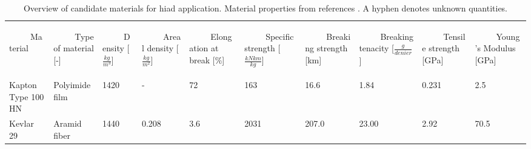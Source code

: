\begin{table}[H]
\caption{Overview of candidate materials for \gls{hiad} application. Material properties from references \cite{Samareh2011,Miller2014}. A hyphen denotes unknown quantities.}
\vspace{41mm}
\hspace{-10mm}
\begin{tabular}{p{}|p{}|p{}|p{}|p{}|p{}|p{}|p{}|p{}|p{}}
\begin{rotate}{60} ~~~~~Material \end{rotate}  &  \begin{rotate}{60} ~~~~~Type of material {[}-{]}  \end{rotate} & \begin{rotate}{60} ~~~~~Density [$\frac{kg}{m^3}$] \end{rotate}& \begin{rotate}{60} ~~~~~Areal density [$\frac{kg}{m^2}$] \end{rotate} & \begin{rotate}{60} ~~~~~Elongation at break [$\%$] \end{rotate} & \begin{rotate}{60} ~~~~~Specific strength [$\frac{kN km}{kg}$]\end{rotate} &  \begin{rotate}{60} ~~~~~Breaking strength [km]\end{rotate} & \begin{rotate}{60} ~~~~~Breaking tenacity [$\frac{g}{denier}$]\end{rotate}&  \begin{rotate}{60} ~~~~~Tensile strength [GPa] \end{rotate} & \begin{rotate}{60} ~~~~~Young's Modulus [GPa] \end{rotate}  \\
Kapton Type 100 HN           & Polyimide film               & 1420                                 & -                                          & 72                           & 163                              & 16.6                       & 1.84                             & 0.231                      & 2.5                                 \\ \hline
Kevlar 29     & Aramid fiber                 & 1440                                 & 0.208                                     & 3.6                          & 2031                             & 207.0                      & 23.00                            & 2.92                       & 70.5                                      \\ \hline

\end{tabular}
\end{table}
